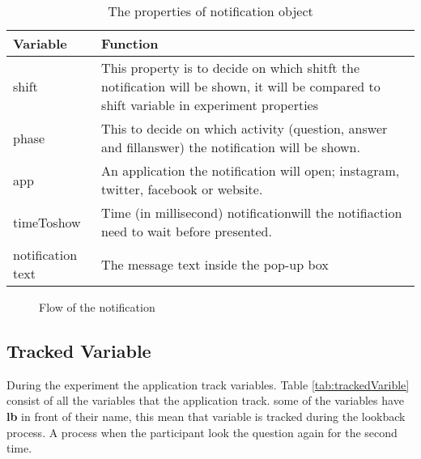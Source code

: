 \begin{table}[!b]
\centering
\small
\footnotesize
\begin{tabu}{|X[2,l]|X[5,l]|}
\hline
Variable          & Function                                                                                                                                  \\ \hline
shift             & This property is to decide on which shitft the notification will be shown, it will be compared to shift variable in experiment properties \\ \hline
phase             & This  to decide on which activity (question, answer and fillanswer) the notification will be shown.                          \\ \hline
app               & An application the notification will open; instagram, twitter, facebook or website.                           \\ \hline
timeToshow        & Time (in millisecond) notificationwill the notifiaction need to wait before presented.                                                           \\ \hline
notification text & The message text inside the pop-up box                                                                                     \\ \hline
\end{tabu}
\caption{The properties of notification object}
\label{NotifactionProperties}

\end{table}


\begin{figure}[!b]
\begin{center}
\end{center}
\centering
\captionsetup{justification=centering}
\caption{Flow of the notification}
\label{fig:clicked_notification_flow}
\end{figure}



\subsection{Tracked Variable}
During the experiment the application track variables. Table \ref{tab:trackedVarible} consist of all the variables that the application track.
some of the variables have \textbf{lb} in front of their name, this mean that variable is tracked during the lookback process.
A process when the participant look the question again for the second time.

